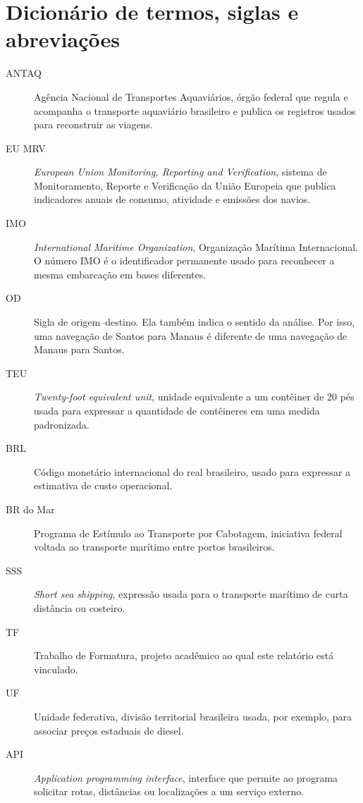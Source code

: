\documentclass[12pt,a4paper,oneside]{report}
\begin{document}
\chapter*{Dicionário de termos, siglas e abreviações}
{}
\small
\begin{description}
  \item[ANTAQ] Agência Nacional de Transportes Aquaviários, órgão federal que regula e acompanha o transporte aquaviário brasileiro e publica os registros usados para reconstruir as viagens.
  \item[EU MRV] \textit{European Union Monitoring, Reporting and Verification}, sistema de Monitoramento, Reporte e Verificação da União Europeia que publica indicadores anuais de consumo, atividade e emissões dos navios.
  \item[IMO] \textit{International Maritime Organization}, Organização Marítima Internacional. O número IMO é o identificador permanente usado para reconhecer a mesma embarcação em bases diferentes.
  \item[OD] Sigla de origem--destino. Ela também indica o sentido da análise. Por isso, uma navegação de Santos para Manaus é diferente de uma navegação de Manaus para Santos.
  \item[TEU] \textit{Twenty-foot equivalent unit}, unidade equivalente a um contêiner de 20 pés usada para expressar a quantidade de contêineres em uma medida padronizada.
  \item[BRL] Código monetário internacional do real brasileiro, usado para expressar a estimativa de custo operacional.
  \item[BR do Mar] Programa de Estímulo ao Transporte por Cabotagem, iniciativa federal voltada ao transporte marítimo entre portos brasileiros.
  \item[SSS] \textit{Short sea shipping}, expressão usada para o transporte marítimo de curta distância ou costeiro.
  \item[TF] Trabalho de Formatura, projeto acadêmico ao qual este relatório está vinculado.
  \item[UF] Unidade federativa, divisão territorial brasileira usada, por exemplo, para associar preços estaduais de diesel.
  \item[API] \textit{Application programming interface}, interface que permite ao programa solicitar rotas, distâncias ou localizações a um serviço externo.

\end{description}
\end{document}
